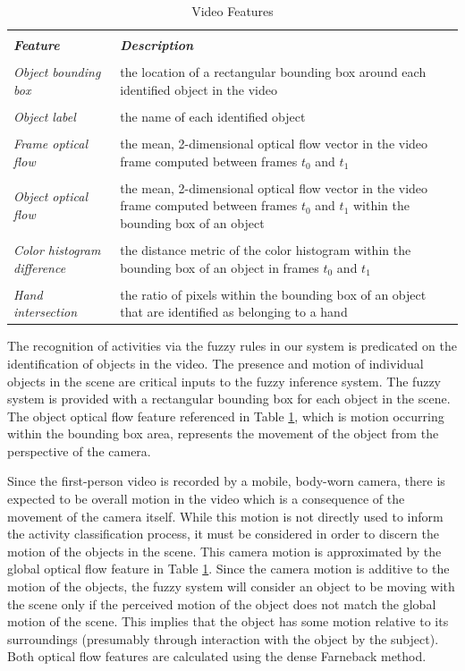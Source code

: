 \documentclass[12pt]{report}
\begin{document}
\begin{table}
\caption{Video Features}
\begin{center}
\begin{tabular}{p{3cm}p{5cm}}
\hline \\
\textbf{\textit{Feature}}&\textbf{\textit{Description}} \\
\hline
\hline \\
\textit{Object bounding box} & the location of a rectangular bounding box around each identified object in the video \\ \\
\textit{Object label} & the name of each identified object \\ \\
\textit{Frame optical flow} & the mean, 2-dimensional optical flow vector in the video frame computed between frames $t_0$ and $t_1$\\ \\
\textit{Object optical flow} & the mean, 2-dimensional optical flow vector in the video frame computed between frames $t_0$ and $t_1$ within the bounding box of an object \\ \\
\textit{Color histogram difference} & the distance metric of the color histogram within the bounding box of an object in frames $t_0$ and $t_1$ \\ \\
\textit{Hand intersection} & the ratio of pixels within the bounding box of an object that are identified as belonging to a hand \\
\hline
\end{tabular}
\label{videoFeatures}
\end{center}
\end{table}


The recognition of activities via the fuzzy rules in our system is predicated on the identification of objects in the video. The presence and motion of individual objects in the scene are critical inputs to the fuzzy inference system. The fuzzy system is provided with a rectangular bounding box for each object in the scene. The object optical flow feature referenced in Table \ref{videoFeatures}, which is motion occurring within the bounding box area, represents the movement of the object from the perspective of the camera. 

Since the first-person video is recorded by a mobile, body-worn camera, there is expected to be overall motion in the video which is a consequence of the movement of the camera itself. While this motion is not directly used to inform the activity classification process, it must be considered in order to discern the motion of the objects in the scene. This camera motion is approximated by the global optical flow feature in Table \ref{videoFeatures}. Since the camera motion is additive to the motion of the objects, the fuzzy system will consider an object to be moving with the scene only if the perceived motion of the object does not match the global motion of the scene. This implies that the object has some motion relative to its surroundings (presumably through interaction with the object by the subject). Both optical flow features are calculated using the dense Farneback method.
\end{document}
